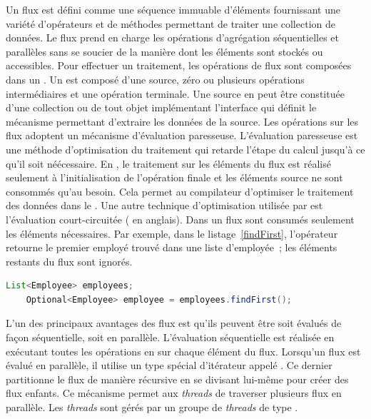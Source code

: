 Un flux est d\'efini comme une s\'equence immuable d'\'el\'ements fournissant une vari\'et\'e d'op\'erateurs et de m\'ethodes permettant de traiter une collection de donn\'ees. Le flux prend en charge les op\'erations d'agr\'egation \citep{javaStreamAggregate} s\'equentielles et parall\`eles sans se soucier de la mani\`ere dont les \'el\'ements sont stock\'es ou accessibles. Pour effectuer un traitement, les op\'erations de flux sont compos\'ees dans un . Un  est compos\'e d'une source, z\'ero ou plusieurs op\'erations interm\'ediaires et une op\'eration terminale. Une source en peut \^etre constitu\'ee d'une collection ou de tout objet impl\'ementant l'interface qui d\'efinit le m\'ecanisme permettant d'extraire les donn\'ees de la source. 
Les op\'erations sur les flux adoptent un m\'ecanisme d'\'evaluation paresseuse. L'\'evaluation paresseuse est une m\'ethode d'optimisation du traitement qui retarde l'\'etape du calcul jusqu'\`a ce qu'il soit n\'eécessaire. En , le traitement sur les \'el\'ements du flux est r\'ealis\'e seulement \`a l'initialisation de l'op\'eration finale et les \'el\'ements source ne sont consomm\'es qu'au besoin. Cela permet au compilateur d'optimiser le traitement des donn\'ees dans le .
Une autre technique d'optimisation utilis\'ee par  est l'\'evaluation court-circuit\'ee ( en anglais). Dans un flux sont consum\'es seulement les \'el\'ements n\'ecessaires. Par exemple, dans le listage~\ref{findFirst}, l'opérateur  retourne le premier employ\'e trouv\'e dans une liste d'employ\'ee~; les \'el\'ements restants du flux sont ignor\'es.

\begin{Listing}[tbp]
\begin{lstlisting}[language=java]
	List<Employee> employees;
	Optional<Employee> employee = employees.findFirst();
\end{lstlisting}
\caption{Optimisation du traitement d'un flux en utilisant la technique de court-circuit.}
\label{findFirst}
\end{Listing}

L'un des principaux avantages des flux est qu'ils peuvent \^etre soit \'evalu\'es de fa\c{c}on s\'equentielle, soit en parall\`ele. L'\'evaluation s\'equentielle est r\'ealis\'ee en ex\'ecutant toutes les op\'erations en  sur chaque \'el\'ement du flux. Lorsqu'un flux est \'evalu\'e en parall\`ele, il utilise un type sp\'ecial d'it\'erateur appel\'e . Ce dernier partitionne le flux de mani\`ere r\'ecursive en se divisant lui-m\^eme pour cr\'eer des flux enfants. Ce m\'ecanisme permet aux \emph{threads} de traverser plusieurs flux en parall\`ele. Les \emph{threads} sont g\'er\'es par un groupe de \emph{threads} de type .


